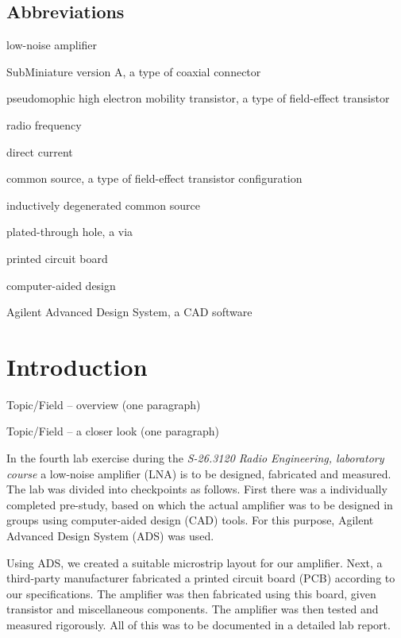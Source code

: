 \documentclass[a4paper, 12pt]{article}
\begin{document}
\newpage
\subsection*{Abbreviations}

	\begin{description}[font=\rmfamily\mdseries, leftmargin=25.5mm, style=sameline, align=right, labelsep=5mm, itemsep=-2pt]
		\item[LNA]					low-noise amplifier
		\item[SMA]					SubMiniature version A, a type of coaxial connector
		\item[pHEMT]				pseudomophic high electron mobility transistor, a type of field-effect transistor
		\item[RF]					radio frequency
		\item[DC]					direct current
		\item[CS]					common source, a type of field-effect transistor configuration
		\item[IDCS]					inductively degenerated common source
		\item[PTH]					plated-through hole, a via
		\item[PCB]					printed circuit board
		\item[CAD]					computer-aided design
		\item[ADS]					Agilent Advanced Design System, a CAD software
	\end{description}

\newpage
\section{Introduction}

Topic/Field -- overview (one paragraph)

Topic/Field -- a closer look (one paragraph)

In the fourth lab exercise during the \textit{S-26.3120 Radio Engineering, laboratory course} 
a low-noise amplifier (LNA) is to be designed, fabricated and measured. The lab was divided into 
checkpoints as follows. First there was a individually completed pre-study, based on which 
the actual amplifier was to be designed in groups using computer-aided design (CAD) tools. 
For this purpose, Agilent Advanced Design System (ADS) was used.

Using ADS, we created a suitable microstrip layout for our amplifier. Next, a third-party 
manufacturer fabricated a printed circuit board (PCB) according to our specifications. 
The amplifier was then fabricated using this board, given transistor and miscellaneous 
components. The amplifier was then tested and measured rigorously. All of this was to be 
documented in a detailed lab report.
\end{document}
